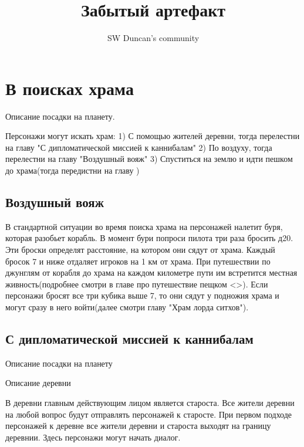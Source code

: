 \documentclass{article}
\title{Забытый артефакт}
\author{SW Duncan's community}
\begin{document}
\pagecolor{sky_black}
\BgThispage
\maketitle %
\newpage
\tableofcontents %
\newpage
\section{В поисках храма}

Описание посадки на планету.
\begin{myquote}
\color{sw}

\end{myquote}
Персонажи могут искать храм:
1) С помощью жителей деревни, тогда перелестни на главу "С дипломатической миссией к каннибалам"
2) По воздуху, тогда перелестни на главу "Воздушный вояж"
3) Спуститься на землю и идти пешком до храма(тогда передистни на главу )
\subsection{Воздушный вояж}
В стандартной ситуации во время поиска храма на персонажей налетит буря, которая разобьет корабль.
В момент бури попроси пилота три раза бросить д20. Эти броски определят расстояние, на котором они сядут от храма.
Каждый бросок 7 и ниже отдаляет игроков на 1 км от храма. При путешествии по джунглям от корабля до храма на каждом километре пути им встретится местная живность(подробнее смотри в главе про путешествие пещком <>). Если персонажи бросят все три кубика выше 7, то они сядут у подножия храма и могут сразу в него войти(далее смотри главу "Храм лорда ситхов").

\begin{myquote}
\color{sw}

\end{myquote}
\subsection{С дипломатической миссией к каннибалам}
Описание посадки на планету
\begin{myquote}
\color{sw}

\end{myquote}

Описание деревни
\begin{myquote}
\color{sw}

\end{myquote}
В деревни главным действующим лицом является староста. Все жители деревни на любой вопрос будут отправлять персонажей к старосте. При первом подходе персонажей к деревне все жители деревни и староста выходят на границу деревнии. Здесь персонажи могут начать диалог.
\end{document}
